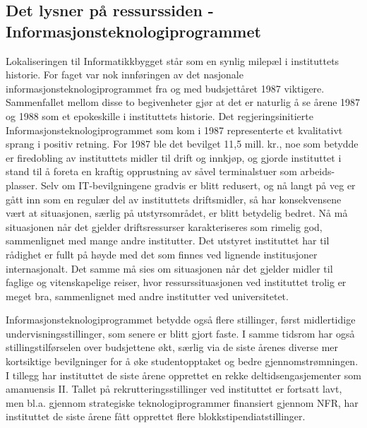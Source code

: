 \documentclass[../main.tex]{subfiles}
\begin{document}
\subsection{Det lysner på ressurssiden - Informasjonsteknologiprogrammet}
Lokaliseringen til Informatikkbygget står som en synlig milepæl i instituttets historie. For faget var nok innføringen av det nasjonale informasjonsteknologiprogrammet fra og med budsjettåret 1987 viktigere. Sammenfallet mellom disse to begivenheter gjør at det er naturlig å se årene 1987 og 1988 som et epokeskille i instituttets historie.
Det regjeringsinitierte Informasjonsteknologiprogrammet som kom i 1987 representerte et kvalitativt sprang i positiv retning. For 1987 ble det bevilget 11,5 mill. kr., noe som betydde er firedobling av instituttets midler til drift og innkjøp, og gjorde instituttet i stand til å foreta en kraftig opprustning av såvel terminalstuer som arbeids-plasser. Selv om IT-bevilgningene gradvis er blitt redusert, og nå langt på veg er gått inn som en regulær del av instituttets driftsmidler, så har konsekvensene vært at situasjonen, særlig på utstyrsområdet, er blitt betydelig bedret. Nå må situasjonen når det gjelder driftsressurser karakteriseres som rimelig god, sammenlignet med mange andre institutter. Det utstyret instituttet har til rådighet er fullt på høyde med det som finnes ved lignende institusjoner internasjonalt. Det samme må sies om situasjonen når det gjelder midler til faglige og vitenskapelige reiser, hvor ressurssituasjonen ved instituttet trolig er meget bra, sammenlignet med andre institutter ved universitetet.

Informasjonsteknologiprogrammet betydde også flere stillinger, først midlertidige undervisningsstillinger, som senere er blitt gjort faste. I samme tidsrom har også stillingstilførselen over budsjettene økt, særlig via de siste årenes diverse mer kortsiktige bevilgninger for å øke studentopptaket og bedre gjennomstrømningen. I tillegg har instituttet de siste årene opprettet en rekke deltidsengasjementer som amanuensis II. Tallet på rekrutteringsstillinger ved instituttet er fortsatt lavt, men bl.a. gjennom strategiske teknologiprogrammer finansiert gjennom NFR, har instituttet de siste årene fått opprettet flere blokkstipendiatstillinger.
\end{document}
